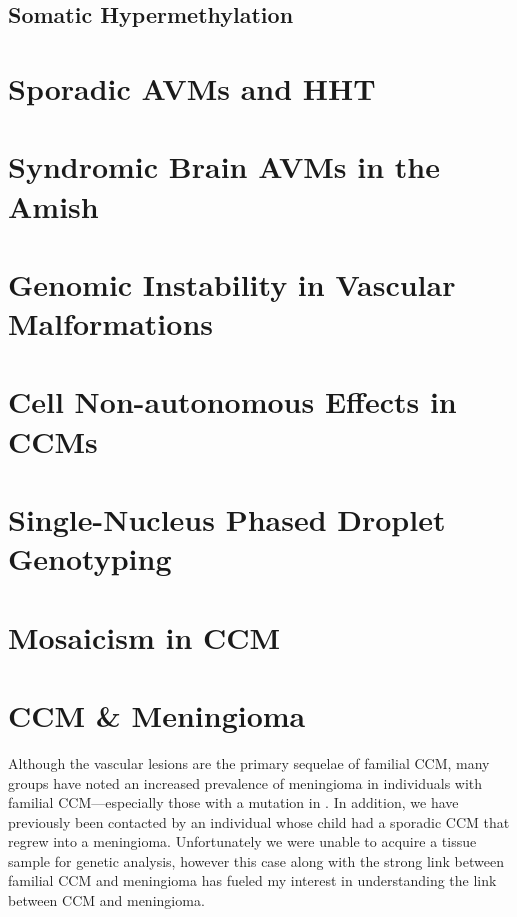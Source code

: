 \subsection{Somatic Hypermethylation}



\section{Sporadic AVMs and HHT}



\section{Syndromic Brain AVMs in the Amish}




\section{Genomic Instability in Vascular Malformations}



\section{Cell Non-autonomous Effects in CCMs}



\section{Single-Nucleus Phased Droplet Genotyping}


\section{Mosaicism in CCM}





\section{CCM \& Meningioma}
Although the vascular lesions are the primary sequelae of familial CCM, many groups have noted an increased prevalence of meningioma in individuals with familial CCM---especially those with a mutation in  \citep{labauge2009, riant2013, garaci2015}. In addition, we have previously been contacted by an individual whose child had a sporadic CCM that regrew into a meningioma. Unfortunately we were unable to acquire a tissue sample for genetic analysis, however this case along with the strong link between familial CCM and meningioma has fueled my interest in understanding the link between CCM and meningioma. 

